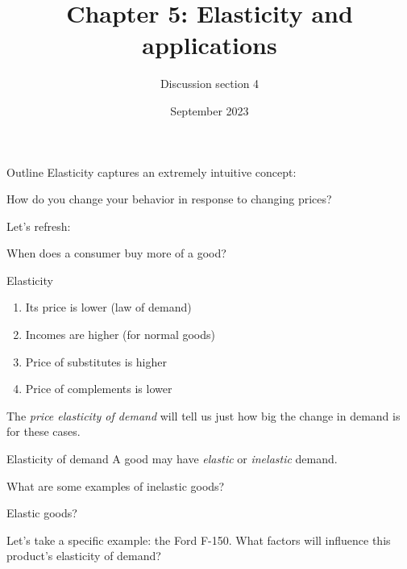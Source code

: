 \documentclass[aspectratio=169]{beamer}
\title{Chapter 5: Elasticity and applications}
\author{Discussion section 4}
\date{September 2023}
\begin{document}
\begin{frame}
    \titlepage 
\end{frame}

\begin{frame}{Outline}
    Elasticity captures an extremely intuitive concept: 
    
    \begin{center}
        How do you change your behavior in response to changing prices?
    \end{center}

    \medskip

    Let's refresh:

    \begin{center}
        When does a consumer buy more of a good?
    \end{center}

\end{frame}

\begin{frame}{Elasticity}
    \begin{enumerate}
        \item Its price is lower (law of demand)
        \item Incomes are higher (for normal goods)
        \item Price of substitutes is higher
        \item Price of complements is lower
    \end{enumerate}

    \medskip

    The \textit{price elasticity of demand} will tell us just how big the change in demand is for these cases.
\end{frame}

\begin{frame}{Elasticity of demand}
    A good may have \textit{elastic} or \textit{inelastic} demand.

    \medskip

    What are some examples of inelastic goods? 
    
    \medskip

    Elastic goods?

    \medskip

    \medskip

    Let's take a specific example: the Ford F-150. What factors will influence this product's elasticity of demand?
\end{frame}
\end{document}
